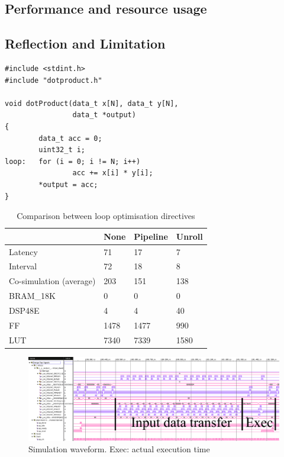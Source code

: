\documentclass[journal]{IEEEtran}
\begin{document}
\subsection{Performance and resource usage}

\subsection{Reflection and Limitation}

\iffalse

\begin{lstlisting}[caption={High level synthesis design for dot product},captionpos=b,label=lst:dotp]
#include <stdint.h>
#include "dotproduct.h"

void dotProduct(data_t x[N], data_t y[N],
                data_t *output)
{
        data_t acc = 0;
        uint32_t i;
loop:   for (i = 0; i != N; i++)
                acc += x[i] * y[i];
        *output = acc;
}
\end{lstlisting}



\begin{table}[!ht]
	\renewcommand{\arraystretch}{1.3}
	\caption{Comparison between loop optimisation directives}
	\label{tbl:dir}
	\centering
	\begin{tabular}{llll}
		\hline
			& None	& Pipeline	& Unroll \\
		\hline
		Latency	& 71	& 17	& 7	\\
		Interval	& 72	& 18	& 8	\\
		Co-simulation (average)	& 203	& 151	& 138	\\
		\hline
		BRAM\_18K	& 0	& 0	& 0	\\
		DSP48E	& 4	& 4	& 40	\\
		FF	& 1478	& 1477	& 990	\\
		LUT	& 7340	& 7339	& 1580	\\
		\hline
	\end{tabular}
\end{table}



\begin{figure}[!t]
	\centering
	\includegraphics[width=\textwidth]{sim}
	\caption{Simulation waveform. Exec: actual execution time}
	\label{fig:sim}
\end{figure}
\end{document}
